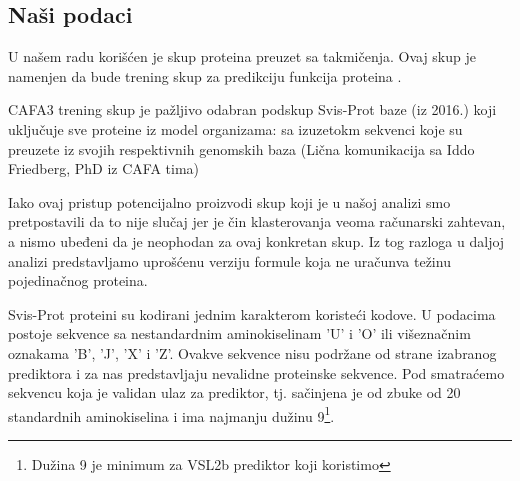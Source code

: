 %

\subsection{Naši podaci}

U našem radu korišćen je skup proteina preuzet sa  takmičenja.
Ovaj skup je namenjen da bude trening skup za predikciju funkcija proteina \parencite{CAFA}. 

CAFA3 trening skup je pažljivo odabran podskup Svis-Prot baze (iz 2016.) koji
uključuje sve proteine iz model organizama:  sa izuzetokm sekvenci  koje su preuzete iz svojih respektivnih genomskih baza (Lična
komunikacija sa Iddo Friedberg, PhD iz CAFA tima)

Iako ovaj pristup potencijalno proizvodi skup koji je  u našoj analizi smo pretpostavili da to nije slučaj jer je čin
klasterovanja veoma računarski zahtevan, a nismo ubeđeni da je neophodan za
ovaj konkretan skup. Iz tog razloga u daljoj analizi predstavljamo uprošćenu
verziju formule koja ne uračunva težinu pojedinačnog proteina.

Svis-Prot proteini su kodirani jednim karakterom koristeći 
kodove.  U podacima postoje sekvence sa nestandardnim aminokiselinam 'U' i 'O'
ili višeznačnim oznakama 'B', 'J', 'X' i 'Z'.  Ovakve sekvence nisu podržane od
strane izabranog prediktora i za nas predstavljaju nevalidne proteinske sekvence. Pod
 smatraćemo sekvencu koja je validan
ulaz za prediktor, tj. sačinjena je od  zbuke od 20 standardnih aminokiselina i
ima najmanju dužinu 9\footnote{ Dužina 9 je minimum za VSL2b prediktor koji
koristimo}.

